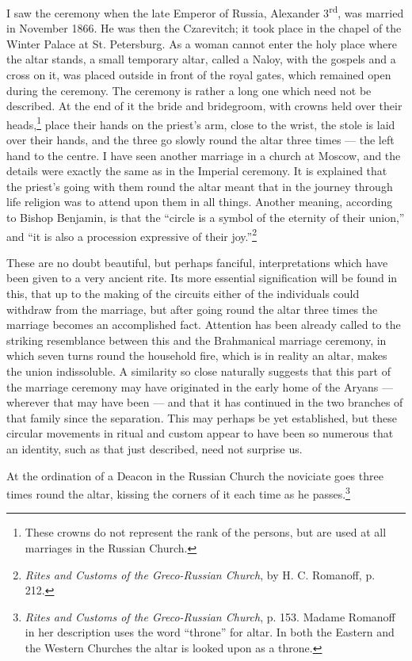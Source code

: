 \documentclass[a4paper, 11pt, oneside, polutonikogreek, english]{article}
\begin{document}
I saw the ceremony when the late Emperor of Russia, Alexander 3\textsuperscript{rd}, was married in November 1866. He was then the Czarevitch; it took place in the chapel of the Winter Palace at St. Petersburg. As a woman cannot enter the holy place where the altar stands, a small temporary altar, called a Naloy, with the gospels and a cross on it, was placed outside in front of the royal gates, which remained open during the ceremony. The ceremony is rather a long one which need not be described. At the end of it the bride and bridegroom, with crowns held over their heads,\footnote{These crowns do not represent the rank of the persons, but are used at all marriages in the Russian Church.} place their hands on the priest's arm, close to the wrist, the stole is laid over their hands, and the three go slowly round the altar three times --- the left hand to the centre. I have seen another marriage in a church at Moscow, and the details were exactly the same as in the Imperial ceremony. It is explained that the priest's going with them round the altar meant that in the journey through life religion was to attend upon them in all things. Another meaning, according to Bishop Benjamin, is that the ``circle is a symbol of the eternity of their union,'' and ``it is also a procession expressive of their joy.''\footnote{\emph{Rites and Customs of the Greco-Russian Church}, by H. C. Romanoff, p. 212.}

These are no doubt beautiful, but perhaps fanciful, interpretations which have been given to a very ancient rite. Its more essential signification will be found in this, that up to the making of the circuits either of the individuals could withdraw from the marriage, but after going round the altar three times the marriage becomes an accomplished fact. Attention has been already called to the striking resemblance between this and the Brahmanical marriage ceremony, in which seven turns round the household fire, which is in reality an altar, makes the union indissoluble. A similarity so close naturally suggests that this part of the marriage ceremony may have originated in the early home of the Aryans --- wherever that may have been --- and that it has continued in the two branches of that family since the separation. This may perhaps be yet established, but these circular movements in ritual and custom appear to have been so numerous that an identity, such as that just described, need not surprise us.

At the ordination of a Deacon in the Russian Church the noviciate goes three times round the altar, kissing the corners of it each time as he passes.\footnote{\emph{Rites and Customs of the Greco-Russian Church}, p. 153. Madame Romanoff in her description uses the word ``throne'' for altar. In both the Eastern and the Western Churches the altar is looked upon as a throne.}
\end{document}
